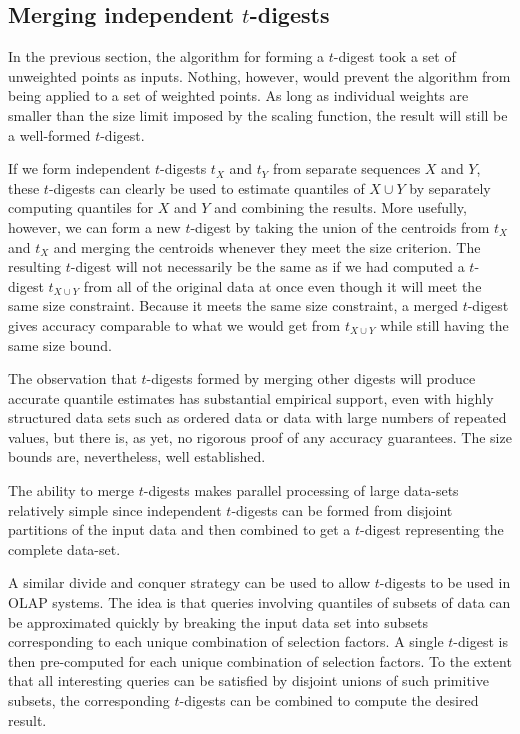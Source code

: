 \documentclass[11pt]{amsart}
\begin{document}
\subsection{Merging independent $t$-digests}
In the previous section, the algorithm for forming a $t$-digest took a set of unweighted points as inputs. Nothing, however, would prevent the algorithm from being applied to a set of weighted points. As long as individual weights are smaller than the size limit imposed by the scaling function, the result will still be a well-formed $t$-digest.

If we form independent $t$-digests $t_X$ and $t_Y$ from separate sequences $X$ and $Y$, these $t$-digests can clearly be used to estimate quantiles of $X \cup Y$ by separately computing quantiles for $X$ and $Y$ and combining the results. More usefully, however, we can form a new $t$-digest by taking the union of the centroids from $t_X$ and $t_X$ and merging the centroids whenever they meet the size criterion. The resulting $t$-digest will not necessarily be the same as if we had computed a $t$-digest $t_{X \cup Y}$ from all of the original data at once even though it will meet the same size constraint. Because it meets the same size constraint, a merged $t$-digest gives accuracy comparable to what we would get from $t_{X\cup Y}$ while still having the same size bound.

The observation that $t$-digests formed by merging other digests will produce accurate quantile estimates has substantial empirical support, even with highly structured data sets such as ordered data or data with large numbers of repeated values, but there is, as yet, no rigorous proof of any accuracy guarantees. The size bounds are, nevertheless, well established.

The ability to merge $t$-digests makes parallel processing of large data-sets relatively simple since independent $t$-digests can be formed from disjoint partitions of the input data and then combined to get a $t$-digest representing the complete data-set.

A similar divide and conquer strategy can be used to allow $t$-digests to be used in OLAP systems. The idea is that queries involving quantiles of subsets of data can be approximated quickly by breaking the input data set into subsets corresponding to each unique combination of selection factors. A single $t$-digest is then pre-computed for each unique combination of selection factors. To the extent that all interesting queries can be satisfied by disjoint unions of such primitive subsets, the corresponding $t$-digests can be combined to compute the desired result.
\end{document}

